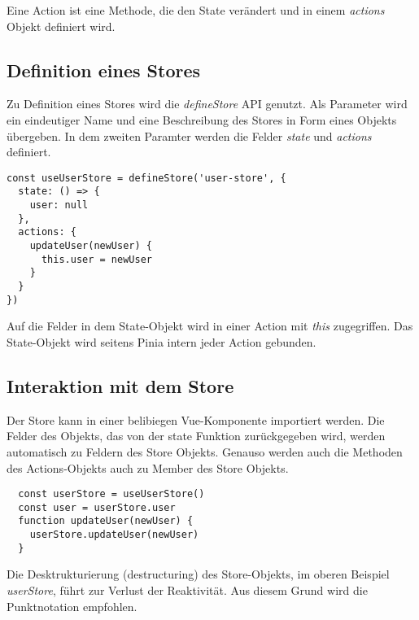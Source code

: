 Eine Action ist eine Methode, die den State verändert und in einem \textit{actions} Objekt definiert wird.

\subsection{Definition eines Stores}

Zu Definition eines Stores wird die \textit{defineStore} API genutzt. Als Parameter wird ein eindeutiger Name und eine Beschreibung des Stores in Form eines Objekts übergeben. In dem zweiten Paramter werden die Felder \textit{state} und \textit{actions} definiert.

\begin{lstlisting}
const useUserStore = defineStore('user-store', {
  state: () => {
    user: null
  },
  actions: {
    updateUser(newUser) {
      this.user = newUser
    }
  }
})
\end{lstlisting}

Auf die Felder in dem State-Objekt wird in einer Action mit \textit{this} zugegriffen. Das State-Objekt wird seitens Pinia intern jeder Action gebunden.

\subsection{Interaktion mit dem Store}

Der Store kann in einer belibiegen Vue-Komponente importiert werden. Die Felder des Objekts, das von der state Funktion zurückgegeben wird, werden automatisch zu Feldern des Store Objekts. Genauso werden auch die Methoden des Actions-Objekts auch zu Member des Store Objekts.

\begin{lstlisting}
  const userStore = useUserStore()
  const user = userStore.user
  function updateUser(newUser) {
    userStore.updateUser(newUser)
  }
\end{lstlisting}

Die Desktrukturierung (destructuring) des Store-Objekts, im oberen Beispiel \textit{userStore}, führt zur Verlust der Reaktivität. Aus diesem Grund wird die Punktnotation empfohlen.\cite{piniaDefiningAStore}